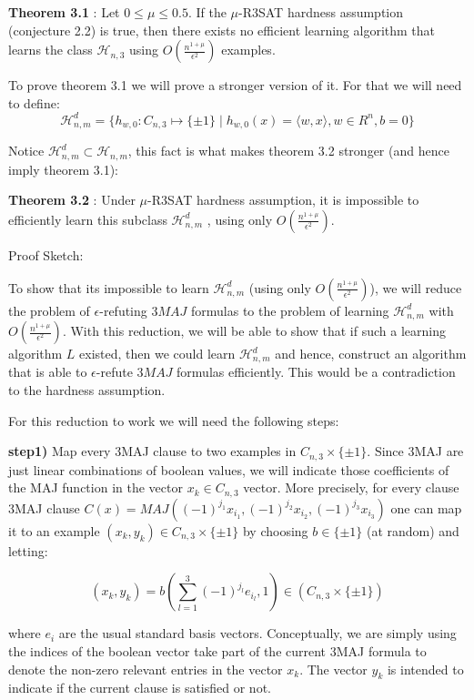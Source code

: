 \documentclass[11pt,a4paper]{article}
\begin{document}
\textbf{Theorem 3.1 }: Let $0 \leq \mu \leq 0.5$. If the $\mu$-R3SAT hardness assumption (conjecture 2.2) is true, then there exists no efficient learning algorithm that learns the class $\mathcal{H}_{n,3}$ using $O \left(  \frac{n^{1 + \mu }}{\epsilon^2} \right)$ examples.

To prove theorem 3.1 we will prove a stronger version of it. For that we will need to define:
$$ \mathcal{H}^d_{n,m} = \{ h_{w,0} : C_{n, 3} \mapsto \{ \pm 1\} \mid h_{w,0}(x) = \langle w, x \rangle, w \in R^n, b = 0 \}$$

Notice $\mathcal{H}^d_{n,m} \subset \mathcal{H}_{n,m}$, this fact is what makes theorem 3.2 stronger (and hence imply theorem 3.1):

\textbf{Theorem 3.2 }: Under $\mu$-R3SAT hardness assumption, it is impossible to efficiently learn this subclass  $\mathcal{H}^d_{n,m}$ , using only $O \left(  \frac{n^{1 + \mu }}{\epsilon^2} \right)$.

Proof Sketch:

To show that its impossible to learn $\mathcal{H}^d_{n,m}$ (using only $O \left(  \frac{n^{1 + \mu }}{\epsilon^2} \right)$), we will reduce the problem of $\epsilon$-refuting $3MAJ$ formulas to the problem of learning $\mathcal{H}^d_{n,m}$ with $O \left(  \frac{n^{1 + \mu }}{\epsilon^2} \right)$. With this reduction, we will be able to show that if such a learning algorithm $L$ existed, then we could learn $\mathcal{H}^d_{n,m}$ and hence, construct an algorithm that is able to $\epsilon$-refute $3MAJ$ formulas efficiently. This would be a contradiction to the hardness assumption.

For this reduction to work we will need the following steps:

\textbf{step1)} Map every 3MAJ clause to two examples in $C_{n,3} \times \{ \pm 1 \}$. Since 3MAJ are just linear combinations of boolean values, we will indicate those coefficients of the MAJ function in the vector $x_k \in C_{n,3}$ vector. More precisely, for every clause 3MAJ clause $ C(x) = MAJ( (-1)^{j_1}x_{i_1} , (-1)^{j_2}x_{i_2} , (-1)^{j_3}x_{i_3} )$ one can map it to an example $(x_k , y_k) \in C_{n , 3} \times \{ \pm 1\}$ by choosing $b \in \{ \pm 1\}$ (at random) and letting:

$$(x_k, y_k) = b (\sum^3_{l=1} (-1)^{j_l} e_{i_l}, 1) \in (C_{n,3} \times \{ \pm 1 \})$$

where $e_i$ are the usual standard basis vectors.
Conceptually, we are simply using the indices of the boolean vector take part of the current 3MAJ formula to denote the non-zero relevant entries in the vector $x_k$.
The vector $y_k$ is intended to indicate if the current clause is satisfied or not.
\end{document}
